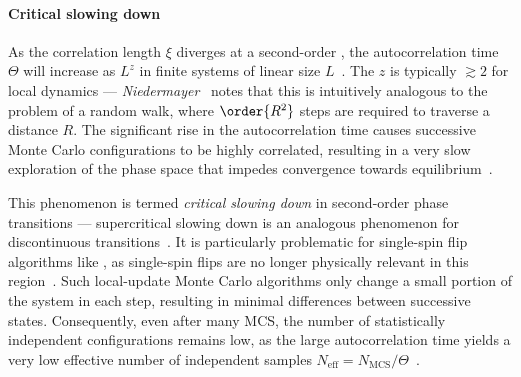 \paragraph{Critical slowing down}
As the correlation length $\xi$ diverges at a second-order , the autocorrelation time $\Theta$ will increase as $L^z$ in finite systems of linear size $L$~\cite{NumericalDynamicalNiedermayer}.
The  $z$ is typically $\gtrsim 2$ for local dynamics --- \textit{Niedermayer}~\cite{niedermayer1988general} notes that this is intuitively analogous to the problem of a random walk, where $\order{R^2}$ steps are required to traverse a distance $R$.
The significant rise in the autocorrelation time causes successive Monte Carlo configurations to be highly correlated, resulting in a very slow exploration of the phase space that impedes convergence towards equilibrium~\cite{NumericalDynamicalNiedermayer,CompStatPhys,StatisticalMechanicsAlgorithmsComputations}. \par
This phenomenon is termed \emph{critical slowing down} in second-order phase transitions --- supercritical slowing down is an analogous phenomenon for discontinuous transitions~\cite{PhD_Reynal}.
It is particularly problematic for single-spin flip algorithms like , as single-spin flips are no longer physically relevant in this region~\cite{PhD_Reynal}.
Such local-update Monte Carlo algorithms only change a small portion of the system in each step, resulting in minimal differences between successive states.
Consequently, even after many MCS, the number of statistically independent configurations remains low, as the large autocorrelation time yields a very low effective number of independent samples $N_\mathrm{eff} = N_\mathrm{MCS}/\Theta$~\cite{niedermayer1988general,BeatCriticalSlowingDown1990}. \par

